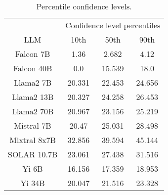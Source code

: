 \begin{table*}
\centering
\begin{tabular}{c|c|c|c}
& \multicolumn{3}{c}{Confidence level percentiles} \\ 
LLM & 10th & 50th & 90th\\ \hline
Falcon 7B & 1.36 & 2.682 & 4.12\\
Falcon 40B & 0.0 & 15.539 & 18.0\\
Llama2 7B & 20.331 & 22.453 & 24.656\\
Llama2 13B & 20.327 & 24.258 & 26.453\\
Llama2 70B & 20.967 & 23.156 & 25.219\\
Mistral 7B & 20.47 & 25.031 & 28.498\\
Mixtral 8x7B & 32.856 & 39.594 & 45.144\\
SOLAR 10.7B & 23.061 & 27.438 & 31.516\\
Yi 6B & 16.156 & 17.359 & 18.953\\
Yi 34B & 20.047 & 21.516 & 23.328\\
\hline
\end{tabular}
\caption{Percentile confidence levels.}
\label{tab:percentile_conf}
\end{table*}
